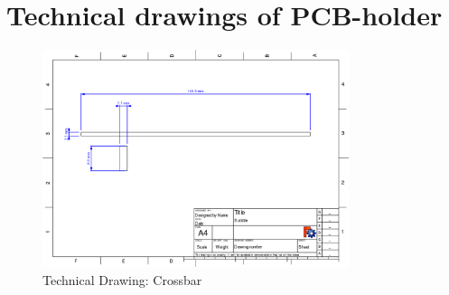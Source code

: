 \documentclass{report}
\begin{document}



\clearpage
{}
\setcounter{page}{\value{roman}}
\pagestyle{empty}

\printbibliography[heading=bibintoc]

\appendix



\chapter{Technical drawings of PCB-holder}
\label{append:techDrawPCB}

\begin{figure}[H]
\centering  
\includegraphics[width=0.8\textwidth]{./fig/pcb_holder_crossbar}
\caption{Technical Drawing: Crossbar} 
\end{figure} 
\end{document}
